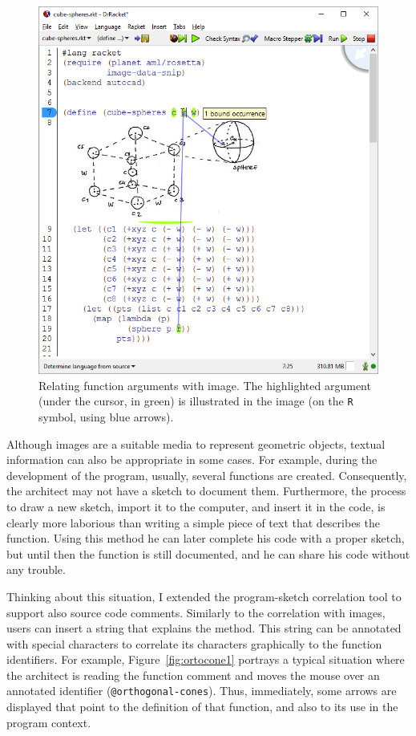 \begin{figure}[!h]
  \centering
  \includegraphics[width=.4\textwidth]{images/img-code}
  \caption{Relating function arguments with image. The highlighted argument (under the cursor, in green) is illustrated in the image (on the \texttt{R} symbol, using blue arrows).}
  \label{fig:rmeaning}
\end{figure}

Although images are a suitable media to represent geometric objects, textual information can also be appropriate in some cases. For example, 
during the development of the program, usually, several functions are created. Consequently, the architect may not have a sketch to document them. Furthermore, the process to draw a new sketch, import it to the computer, and insert it in the code, is clearly more laborious than writing a simple piece of text that describes the function. Using this method he can later complete his code with a proper sketch, but until then the function is still documented, and he can share his code without any trouble.

Thinking about this situation, I extended the program-sketch correlation tool to support also source code comments. Similarly to the correlation with images, users can insert a string that explains the method. This string can be annotated with special characters to correlate its characters graphically to the function identifiers. For example, Figure~\ref{fig:ortocone1} portrays a typical situation where the architect is reading the function comment and moves the mouse over an annotated identifier (\texttt{@orthogonal-cones}). Thus, immediately, some arrows are displayed that point to the definition of that function, and also to its use in the program context.

